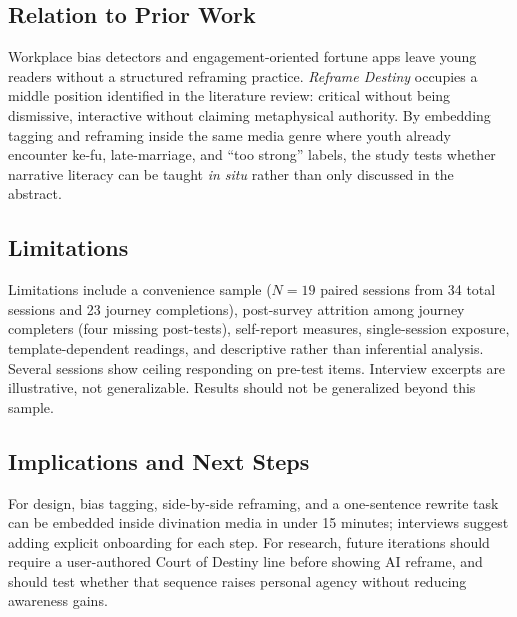 \documentclass[stu,12pt,floatsintext]{apa7}
\begin{document}
\subsection{Relation to Prior Work}

Workplace bias detectors and engagement-oriented fortune apps leave young readers without a structured reframing practice. \textit{Reframe Destiny} occupies a middle position identified in the literature review: critical without being dismissive, interactive without claiming metaphysical authority. By embedding tagging and reframing inside the same media genre where youth already encounter ke-fu, late-marriage, and ``too strong'' labels, the study tests whether narrative literacy can be taught \emph{in situ} rather than only discussed in the abstract.

\subsection{Limitations}

Limitations include a convenience sample ($N = 19$ paired sessions from 34 total sessions and 23 journey completions), post-survey attrition among journey completers (four missing post-tests), self-report measures, single-session exposure, template-dependent readings, and descriptive rather than inferential analysis. Several sessions show ceiling responding on pre-test items. Interview excerpts are illustrative, not generalizable. Results should not be generalized beyond this sample.

\subsection{Implications and Next Steps}

For design, bias tagging, side-by-side reframing, and a one-sentence rewrite task can be embedded inside divination media in under 15 minutes; interviews suggest adding explicit onboarding for each step. For research, future iterations should require a user-authored Court of Destiny line before showing AI reframe, and should test whether that sequence raises personal agency without reducing awareness gains.

\printbibliography
\end{document}
